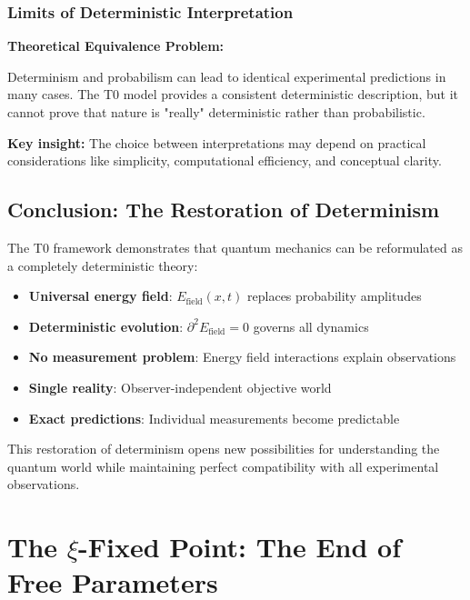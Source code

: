 \documentclass[12pt,a4paper]{report}
\begin{document}
	\subsection{Limits of Deterministic Interpretation}
	\label{subsec:limits_deterministic}
	
	\begin{tcolorbox}[colback=yellow!5!white,colframe=orange!75!black,title=Epistemological Caveat]
		\textbf{Theoretical Equivalence Problem:}
		
		Determinism and probabilism can lead to identical experimental predictions in many cases. The T0 model provides a consistent deterministic description, but it cannot prove that nature is "really" deterministic rather than probabilistic.
		
		\textbf{Key insight:} The choice between interpretations may depend on practical considerations like simplicity, computational efficiency, and conceptual clarity.
	\end{tcolorbox}
	
	\section{Conclusion: The Restoration of Determinism}
	\label{sec:conclusion_determinism}
	
	The T0 framework demonstrates that quantum mechanics can be reformulated as a completely deterministic theory:
	
	\begin{itemize}
		\item \textbf{Universal energy field}: $E_{\text{field}}(x,t)$ replaces probability amplitudes
		\item \textbf{Deterministic evolution}: $\partial^2 E_{\text{field}} = 0$ governs all dynamics
		\item \textbf{No measurement problem}: Energy field interactions explain observations
		\item \textbf{Single reality}: Observer-independent objective world
		\item \textbf{Exact predictions}: Individual measurements become predictable
	\end{itemize}
	
	This restoration of determinism opens new possibilities for understanding the quantum world while maintaining perfect compatibility with all experimental observations.
	
	\chapter{The $\xi$-Fixed Point: The End of Free Parameters}
	\label{chap:xi_fixed_point}
	
\end{document}

